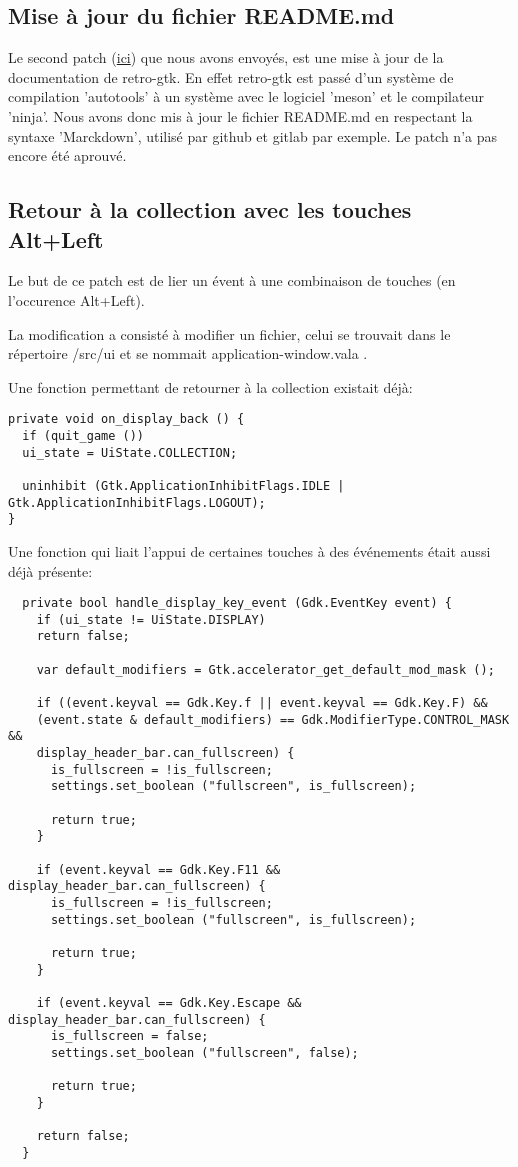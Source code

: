 \documentclass[12pt]{report}
\begin{document}
\subsection{Mise à jour du fichier README.md}
Le second patch (\href{http://bugzilla.gnome.org/show_bug.cgi?id=790454}{ici}) 
que nous avons envoyés, est une mise à jour de la documentation de retro-gtk.
En effet retro-gtk est passé d'un système de compilation 'autotools' à un
système avec le logiciel 'meson' et le compilateur 'ninja'.
Nous avons donc mis à jour le fichier README.md en respectant la syntaxe
'Marckdown', utilisé par github et gitlab par exemple.
Le patch n'a pas encore été aprouvé. \newline

\subsection{Retour à la collection avec les touches Alt+Left}
Le but de ce patch est de lier un évent à une combinaison de touches
(en l'occurence Alt+Left).

La modification a consisté à modifier un fichier, celui se trouvait
dans le répertoire /src/ui et se nommait application-window.vala .

Une fonction permettant de retourner à la collection existait déjà:

\begin{verbatim}
private void on_display_back () {
  if (quit_game ())
  ui_state = UiState.COLLECTION;

  uninhibit (Gtk.ApplicationInhibitFlags.IDLE | Gtk.ApplicationInhibitFlags.LOGOUT);
}
\end{verbatim}

Une fonction qui liait l'appui de certaines touches à des événements
était aussi déjà présente:

\begin{verbatim}
  private bool handle_display_key_event (Gdk.EventKey event) {
    if (ui_state != UiState.DISPLAY)
    return false;

    var default_modifiers = Gtk.accelerator_get_default_mod_mask ();

    if ((event.keyval == Gdk.Key.f || event.keyval == Gdk.Key.F) &&
    (event.state & default_modifiers) == Gdk.ModifierType.CONTROL_MASK &&
    display_header_bar.can_fullscreen) {
      is_fullscreen = !is_fullscreen;
      settings.set_boolean ("fullscreen", is_fullscreen);

      return true;
    }

    if (event.keyval == Gdk.Key.F11 && display_header_bar.can_fullscreen) {
      is_fullscreen = !is_fullscreen;
      settings.set_boolean ("fullscreen", is_fullscreen);

      return true;
    }

    if (event.keyval == Gdk.Key.Escape && display_header_bar.can_fullscreen) {
      is_fullscreen = false;
      settings.set_boolean ("fullscreen", false);

      return true;
    }
    
    return false;
  }
\end{verbatim}
\end{document}
